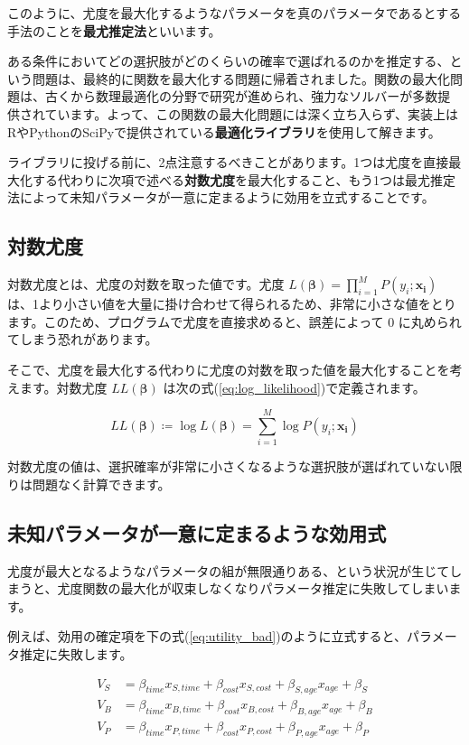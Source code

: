 このように、尤度を最大化するようなパラメータを真のパラメータであるとする手法のことを\textbf{最尤推定法}といいます。

ある条件においてどの選択肢がどのくらいの確率で選ばれるのかを推定する、という問題は、最終的に関数を最大化する問題に帰着されました。関数の最大化問題は、古くから数理最適化の分野で研究が進められ、強力なソルバーが多数提供されています。よって、この関数の最大化問題には深く立ち入らず、実装上はRやPythonのSciPyで提供されている\textbf{最適化ライブラリ}を使用して解きます。

ライブラリに投げる前に、2点注意するべきことがあります。1つは尤度を直接最大化する代わりに次項で述べる\textbf{対数尤度}を最大化すること、もう1つは最尤推定法によって未知パラメータが一意に定まるように効用を立式することです。

\subsection{対数尤度}\label{ssec:log_likelihood}

対数尤度とは、尤度の対数を取った値です。尤度 $L(\bm\beta) = \prod_{i=1}^M P(y_i;\bm{x_i})$ は、1より小さい値を大量に掛け合わせて得られるため、非常に小さな値をとります。このため、プログラムで尤度を直接求めると、誤差によって $0$ に丸められてしまう恐れがあります。

そこで、尤度を最大化する代わりに尤度の対数を取った値を最大化することを考えます。対数尤度 $LL(\bm\beta)$ は次の式(\ref{eq:log_likelihood})で定義されます。

\begin{equation}
    \label{eq:log_likelihood}
    LL(\bm\beta) \coloneq\log L(\bm\beta) = \sum_{i=1}^M \log P(y_i;\bm{x_i})
\end{equation}

対数尤度の値は、選択確率が非常に小さくなるような選択肢が選ばれていない限りは問題なく計算できます。

\subsection{未知パラメータが一意に定まるような効用式}\label{ssec:est_unique}

尤度が最大となるようなパラメータの組が無限通りある、という状況が生じてしまうと、尤度関数の最大化が収束しなくなりパラメータ推定に失敗してしまいます。

例えば、効用の確定項を下の式(\ref{eq:utility_bad})のように立式すると、パラメータ推定に失敗します。

\begin{equation}
    \label{eq:utility_bad}
    \begin{aligned}
        V_S & =\beta_{time}x_{S,time}+\beta_{cost} x_{S,cost}+\beta_{S,age}x_{age}+\beta_S \\
        V_B & =\beta_{time}x_{B,time}+\beta_{cost} x_{B,cost}+\beta_{B,age}x_{age}+\beta_B \\
        V_P & =\beta_{time}x_{P,time}+\beta_{cost} x_{P,cost}+\beta_{P,age}x_{age}+\beta_P
    \end{aligned}
\end{equation}

